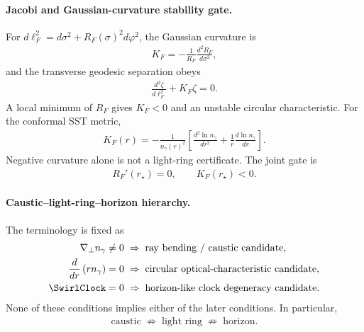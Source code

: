         \paragraph{Jacobi and Gaussian-curvature stability gate.}
        For
        \(d\ell_F^2=d\sigma^2+R_F(\sigma)^2d\varphi^2\), the Gaussian curvature is
        \begin{align}
            \boxed{
            K_F
            =
            -\frac{1}{R_F}
            \frac{d^2R_F}{d\sigma^2},
            }
            \label{eq:rt_fermat_gaussian_curvature}
        \end{align}
        and the transverse geodesic separation obeys
        \begin{align}
            \frac{d^2\zeta}{d\ell_F^2}+K_F\zeta=0.
            \label{eq:rt_fermat_jacobi_equation}
        \end{align}
        A local minimum of \(R_F\) gives \(K_F<0\) and an unstable circular
        characteristic.  For the conformal SST metric,
        \begin{align}
            \boxed{
            K_F(r)
            =
            -\frac{1}{n_\gamma(r)^2}
            \left[
                \frac{d^2\ln n_\gamma}{dr^2}
                +
                \frac{1}{r}\frac{d\ln n_\gamma}{dr}
            \right].
            }
            \label{eq:rt_sst_fermat_curvature}
        \end{align}
        Negative curvature alone is not a light-ring certificate.  The joint gate is
        \begin{align}
            \boxed{
            R_F'(r_\star)=0,
            \qquad
            K_F(r_\star)<0.
            }
            \label{eq:rt_sst_unstable_light_ring_joint_gate}
        \end{align}

        \paragraph{Caustic--light-ring--horizon hierarchy.}
        The terminology is fixed as
        \begin{align}
            \nabla_\perp n_\gamma\neq0
            &\;\Rightarrow\;
            \text{ray bending / caustic candidate},
            \\
            \frac{d}{dr}\left(rn_\gamma\right)=0
            &\;\Rightarrow\;
            \text{circular optical-characteristic candidate},
            \\
            \SwirlClock=0
            &\;\Rightarrow\;
            \text{horizon-like clock degeneracy candidate}.
            \label{eq:rt_caustic_light_ring_horizon_hierarchy}
        \end{align}
        None of these conditions implies either of the later conditions.  In particular,
        \begin{align}
            \boxed{
            \text{caustic}
            \;\not\Rightarrow\;
            \text{light ring}
            \;\not\Rightarrow\;
            \text{horizon}.
            }
        \end{align}

